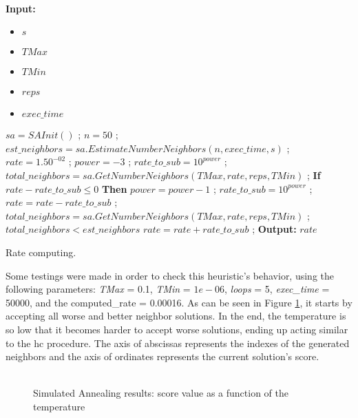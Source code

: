\\
\begin{algorithm}[t!]
\textbf{Input:} 
\begin{itemize}
	\setlength{\itemsep}{1pt}
	\item $s$ 
	\item $TMax$ 
	\item $TMin$ 
	\item $reps$ 
	\item $exec\_time$ 
\end{itemize}
\begin{algorithmic}
\State $sa = SAInit()$ ;
\State $n = 50$ ; 
\State $est\_neighbors = sa.EstimateNumberNeighbors(n, exec\_time, s)$ ;
\State $rate = 1.50^{-02}$ ;
\State $power = -3$ ;
\State $rate\_to\_sub = 10^{power}$ ;
\State $total\_neighbors = sa.GetNumberNeighbors(TMax, rate, reps, TMin)$ ;
\Repeat	
	\State \textbf{If} $rate - rate\_to\_sub \leq 0$ \textbf{Then} $power = power - 1$ ; $rate\_to\_sub = 10^{power}$ ;
	\State $rate = rate - rate\_to\_sub$ ;
	\State $total\_neighbors = sa.GetNumberNeighbors(TMax, rate, reps, TMin)$ ;
\Until $total\_neighbors < est\_neighbors$
\State $rate = rate + rate\_to\_sub$ ; 
\State \textbf{Output:} $rate$ 
\end{algorithmic}
\caption{Rate computing.}
\label{alg:RateComputing}
\end{algorithm}Some testings were made in order to check this heuristic's behavior, using the following parameters: \textit{TMax} = 0.1, \textit{TMin} = $1e-06$, \textit{loops} = 5, \textit{exec\_time} = 50000, and the computed\_rate = 0.00016. As can be seen in Figure \ref{fig:SimulatedAnnealingPlot}, it starts by accepting all worse and better neighbor solutions. In the end, the temperature is so low that it becomes harder to accept worse solutions, ending up acting similar to the \gls{hc} procedure. The axis of abscissas represents the indexes of the generated neighbors and the axis of ordinates represents the current solution's score.\\
\\
\begin{figure}[!t]
\centering


\caption{Simulated Annealing results: score value as a function of the temperature} 
\label{fig:SimulatedAnnealingPlot}
\end{figure}

